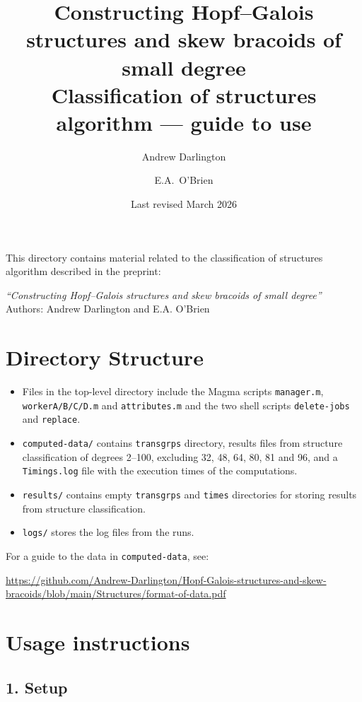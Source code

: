 \documentclass{article}
\title{\textbf{Constructing Hopf--Galois structures and skew bracoids of small degree}\\[0.5em]
\large Classification of structures algorithm --- guide to use}
\author{Andrew Darlington \and E.A.\ O'Brien}
\date{Last revised March 2026}
\begin{document}
\maketitle

This directory contains material related to the classification of structures algorithm described in the preprint:

\begin{center}
    \textit{``Constructing Hopf--Galois structures and skew bracoids of small degree''}\\[0.5em]
    Authors: Andrew Darlington and E.A. O'Brien
\end{center}

\section*{Directory Structure}

\begin{itemize}
    \item Files in the top-level directory include the Magma scripts \texttt{manager.m}, \texttt{workerA/B/C/D.m} and \texttt{attributes.m} and the two shell scripts \texttt{delete-jobs} and \texttt{replace}.

    \item \texttt{computed-data/} contains \texttt{transgrps} directory, results files from structure classification of degrees 2--100, excluding 32, 48, 64, 80, 81 and 96, and a \texttt{Timings.log} file with the execution times of the computations.

    \item \texttt{results/} contains empty \texttt{transgrps} and \texttt{times} directories for storing results from structure classification.

    \item \texttt{logs/} stores the log files from the runs.
\end{itemize}

For a guide to the data in {\tt computed-data}, see: 

\url{https://github.com/Andrew-Darlington/Hopf-Galois-structures-and-skew-bracoids/blob/main/Structures/format-of-data.pdf} 

\section*{Usage instructions}

\subsection*{1. Setup}
\end{document}
